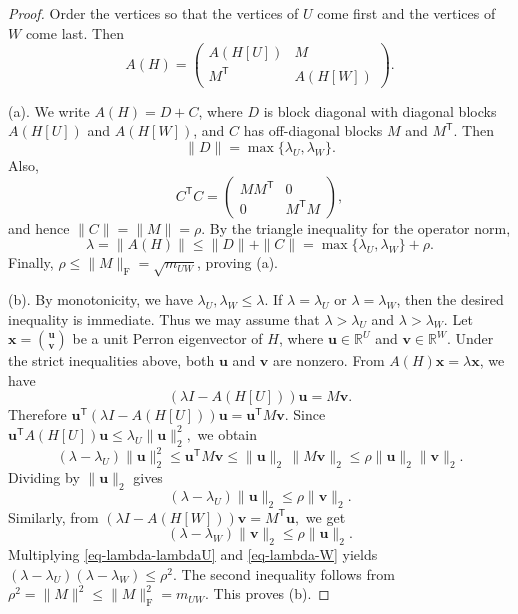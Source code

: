 \documentclass[11pt]{article}
\theoremstyle{definition}
\theoremstyle{plain}
\begin{document}
\begin{proof}
Order the vertices so that the vertices of \(U\) come first and the
vertices of \(W\) come last.  Then
\[
  A(H)=
  \begin{pmatrix}
    A(H[U]) & M\\
    M^{\mathsf T} & A(H[W])
  \end{pmatrix}.
\]

\smallskip
\noindent\textup{(a).}
We write \(A(H)=D+C\), where \(D\) is block diagonal with diagonal blocks
\(A(H[U])\) and \(A(H[W])\), and \(C\) has off-diagonal blocks \(M\) and
\(M^{\mathsf T}\).  Then
\[
        \|D\|=\max\{\lambda_U,\lambda_W\}.
\]
Also,
\[
        C^{\mathsf T}C
        =
        \begin{pmatrix}
          MM^{\mathsf T} & 0\\
          0 & M^{\mathsf T}M
        \end{pmatrix},
\]
and hence \(\|C\|=\|M\|=\rho\).  By the triangle inequality for the
operator norm,
\[
        \lambda=\|A(H)\|
        \le
        \|D\|+\|C\|
        =
        \max\{\lambda_U,\lambda_W\}+\rho.
\]
Finally, \(\rho\le \|M\|_{\mathrm F}=\sqrt{m_{UW}}\), proving (a).

\smallskip
\noindent\textup{(b).}
By monotonicity, we have \(\lambda_U,\lambda_W\le \lambda\).  If
\(\lambda=\lambda_U\) or \(\lambda=\lambda_W\), then the desired
inequality is immediate.  Thus we may assume that $\lambda>\lambda_U$ and $\lambda>\lambda_W.$
Let $\bm{x}=
        \binom{\bm{u}}{\bm{v}}$
be a unit Perron eigenvector of \(H\), where
\(\bm{u}\in\mathbb R^U\) and \(\bm{v}\in\mathbb R^W\).  Under the strict
inequalities above, both \(\bm{u}\) and \(\bm{v}\) are nonzero.  From
\(A(H)\bm{x}=\lambda\bm{x}\), we have
\[
        (\lambda I-A(H[U]))\bm{u}=M\bm{v}.
\]
Therefore $\bm{u}^{\mathsf T}(\lambda I-A(H[U]))\bm{u}
        =
        \bm{u}^{\mathsf T}M\bm{v}.$
Since $\bm{u}^{\mathsf T}A(H[U])\bm{u}
        \le
        \lambda_U\|\bm{u}\|_2^2,$
we obtain
\[
        (\lambda-\lambda_U)\|\bm{u}\|_2^2
        \le
        \bm{u}^{\mathsf T}M\bm{v}
        \le
        \|\bm{u}\|_2\,\|M\bm{v}\|_2
        \le
        \rho\|\bm{u}\|_2\|\bm{v}\|_2.
\]
Dividing by \(\|\bm{u}\|_2\) gives
\begin{equation}
\label{eq-lambda-lambdaU}
        (\lambda-\lambda_U)\|\bm{u}\|_2
        \le
        \rho\|\bm{v}\|_2.
\end{equation}
Similarly, from
$(\lambda I-A(H[W]))\bm{v}=M^{\mathsf T}\bm{u},$
we get
\begin{equation}
\label{eq-lambda-W}
        (\lambda-\lambda_W)\|\bm{v}\|_2
        \le
        \rho\|\bm{u}\|_2.
\end{equation}
Multiplying \eqref{eq-lambda-lambdaU} and \eqref{eq-lambda-W} yields $(\lambda-\lambda_U)(\lambda-\lambda_W)\le \rho^2.$
The second inequality follows from $\rho^2=\|M\|^2\le \|M\|_{\mathrm F}^2=m_{UW}$.
This proves (b).


\end{proof}
\end{document}
